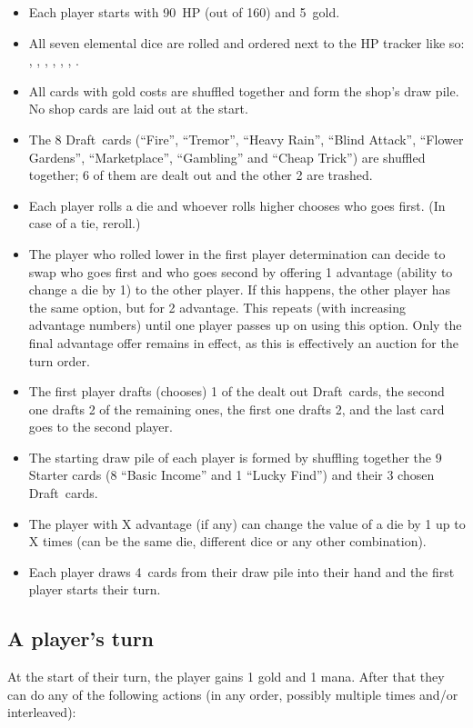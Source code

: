 \documentclass[dvipsnames,parskip,a4paper]{scrartcl}
\newcommand{\iconsize}{3.4mm}
\newcommand{\icondepth}{0.45mm}
\newcommand{\icon}[1]{\raisebox{-\icondepth}{\texttt{[image:  \#1 ]}}}
\newcommand{\chance}{\icon{icons/chance.png}}
\newcommand{\fire}{\icon{icons/fire.png}}
\newcommand{\earth}{\icon{icons/earth.png}}
\newcommand{\water}{\icon{icons/water.png}}
\newcommand{\nature}{\icon{icons/nature.png}}
\newcommand{\magic}{\icon{icons/magic.png}}
\newcommand{\gold}{\icon{icons/gold.png}}
\newcommand{\draft}{Draft}
\newcommand{\startgold}{5}
\newcommand{\handsize}{4}
\newcommand{\starthp}{90}
\newcommand{\maxhp}{160}
\begin{document}
\begin{itemize}
\item Each player starts with \starthp \ HP (out of \maxhp) and \startgold \ gold.
\item All seven elemental dice are rolled and ordered next to the HP tracker like so: \chance, \fire, \earth, \water, \nature, \gold, \magic.
\item All cards with gold costs are shuffled together and form the shop's draw pile. No shop cards are laid out at the start.
\item The 8 \draft \ cards (``Fire'', ``Tremor'', ``Heavy Rain'', ``Blind Attack'', ``Flower Gardens'', ``Marketplace'', ``Gambling'' and ``Cheap Trick'') are shuffled together; 6 of them are dealt out and the other 2 are trashed.
\item Each player rolls a die and whoever rolls higher chooses who goes first. (In case of a tie, reroll.)
\item The player who rolled lower in the first player determination can decide to swap who goes first and who goes second by offering 1 advantage (ability to change a die by 1) to the other player. If this happens, the other player has the same option, but for 2 advantage. This repeats (with increasing advantage numbers) until one player passes up on using this option. Only the final advantage offer remains in effect, as this is effectively an auction for the turn order.
\item The first player drafts (chooses) 1 of the dealt out \draft \ cards, the second one drafts 2 of the remaining ones, the first one drafts 2, and the last card goes to the second player.
\item The starting draw pile of each player is formed by shuffling together the 9 Starter cards (8 ``Basic Income'' and 1 ``Lucky Find'') and their 3 chosen \draft \ cards.
\item The player with X advantage (if any) can change the value of a die by 1 up to X times (can be the same die, different dice or any other combination).
\item Each player draws \handsize \ cards from their draw pile into their hand and the first player starts their turn.
\end{itemize}

\subsection*{A player's turn}

At the start of their turn, the player gains 1 gold and 1 mana. After that they can do any of the following actions (in any order, possibly multiple times and/or interleaved):
\end{document}
